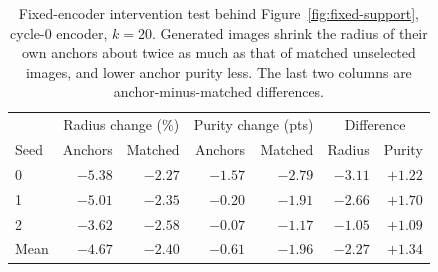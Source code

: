 \begin{table}[t]
\centering
\small
\setlength{\tabcolsep}{5pt}
\caption{Fixed-encoder intervention test behind Figure~\ref{fig:fixed-support}, cycle-0 encoder, $k=20$. Generated images shrink the radius of their own anchors about twice as much as that of matched unselected images, and lower anchor purity less. The last two columns are anchor-minus-matched differences.}
\label{tab:fixed-support}
\begin{tabular}{lrrrrrr}
\toprule
 & \multicolumn{2}{c}{Radius change (\%)} & \multicolumn{2}{c}{Purity change (pts)} & \multicolumn{2}{c}{Difference} \\
Seed & Anchors & Matched & Anchors & Matched & Radius & Purity \\
\midrule
0 & $-5.38$ & $-2.27$ & $-1.57$ & $-2.79$ & $-3.11$ & $+1.22$ \\
1 & $-5.01$ & $-2.35$ & $-0.20$ & $-1.91$ & $-2.66$ & $+1.70$ \\
2 & $-3.62$ & $-2.58$ & $-0.07$ & $-1.17$ & $-1.05$ & $+1.09$ \\
\midrule
Mean & $-4.67$ & $-2.40$ & $-0.61$ & $-1.96$ & $-2.27$ & $+1.34$ \\
\bottomrule
\end{tabular}
\end{table}
